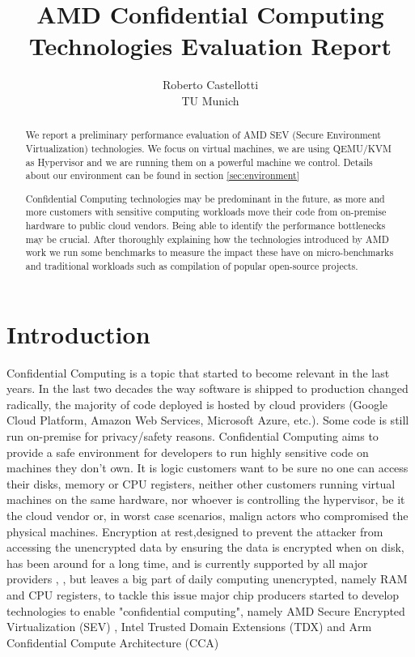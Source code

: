 \documentclass[twocolumn]{article}
\begin{document}
\date{}
\title{\Large \bf AMD Confidential Computing Technologies Evaluation Report}
\author{{\rm Roberto Castellotti}\\TU Munich}
\maketitle

\begin{abstract}
    We report a preliminary performance evaluation of AMD SEV (Secure Environment Virtualization) technologies.
    We focus on virtual machines, we are using QEMU/KVM as Hypervisor and we are running them on a powerful machine we control.
    Details about our environment can be found in section \ref{sec:environment}

    Confidential Computing technologies may be predominant in the future, as more and more customers with sensitive computing workloads move their code from on-premise hardware to public cloud vendors. Being able to identify the performance bottlenecks may be crucial. After thoroughly explaining how the technologies introduced by AMD work we run some benchmarks to measure the impact these have on micro-benchmarks and traditional workloads such as compilation of popular open-source projects.
\end{abstract}

\section{Introduction}
Confidential Computing is a topic that started to become relevant in the last years. In the last two decades the way software is shipped to production changed radically, the majority of code deployed is hosted by cloud providers (Google Cloud Platform, Amazon Web Services, Microsoft Azure, etc.). Some code is still run on-premise for privacy/safety reasons. Confidential Computing aims to provide a safe environment for developers to run highly sensitive code on machines they don't own. It is logic customers want to be sure no one can access their disks, memory or CPU registers, neither other customers running virtual machines on the same hardware, nor whoever is controlling the hypervisor, be it  the cloud vendor  or, in worst case scenarios, malign actors who compromised the physical machines. Encryption at rest,designed to prevent the attacker from accessing the unencrypted data by ensuring the data is encrypted when on disk, has been around for a long time, and is currently supported by all major providers \cite{aws-enc}, \cite{gcp-enc}, \cite{azure-enc} but leaves a big part of daily computing unencrypted, namely RAM and CPU registers, to tackle this issue major chip producers started to develop technologies to enable "confidential computing", namely AMD Secure Encrypted Virtualization (SEV) \cite{memory-encryption}, Intel Trusted Domain Extensions (TDX) \cite{tdx} and Arm Confidential Compute Architecture (CCA) \cite{cca}
\end{document}

